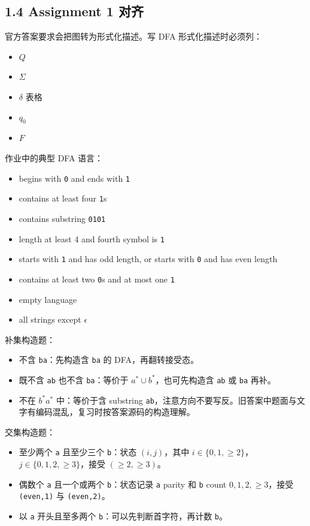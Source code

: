 ﻿\documentclass[UTF8,11pt]{ctexart}
\begin{document}
\subsection{1.4 Assignment 1 对齐}


官方答案要求会把图转为形式化描述。写 DFA 形式化描述时必须列：


\begin{itemize}
\item \(Q\)
\item \(\Sigma\)
\item \(\delta\) 表格
\item \(q_0\)
\item \(F\)
\end{itemize}


作业中的典型 DFA 语言：


\begin{itemize}
\item begins with \texttt{0} and ends with \texttt{1}
\item contains at least four \texttt{1}s
\item contains substring \texttt{0101}
\item length at least 4 and fourth symbol is \texttt{1}
\item starts with \texttt{1} and has odd length, or starts with \texttt{0} and has even length
\item contains at least two \texttt{0}s and at most one \texttt{1}
\item empty language
\item all strings except \(\epsilon\)
\end{itemize}


补集构造题：


\begin{itemize}
\item 不含 \texttt{ba}：先构造含 \texttt{ba} 的 DFA，再翻转接受态。
\item 既不含 \texttt{ab} 也不含 \texttt{ba}：等价于 \(a^*\cup b^*\)，也可先构造含 \texttt{ab} 或 \texttt{ba} 再补。
\item 不在 \(b^*a^*\) 中：等价于含 substring \texttt{ab}，注意方向不要写反。旧答案中题面与文字有编码混乱，复习时按答案源码的构造理解。
\end{itemize}


交集构造题：


\begin{itemize}
\item 至少两个 \texttt{a} 且至少三个 \texttt{b}：状态 \((i,j)\)，其中 \(i\in\{0,1,\ge2\}\)，\(j\in\{0,1,2,\ge3\}\)，接受 \((\ge2,\ge3)\)。
\item 偶数个 \texttt{a} 且一个或两个 \texttt{b}：状态记录 \texttt{a} parity 和 \texttt{b} count \(0,1,2,\ge3\)，接受 \texttt{(even,1)} 与 \texttt{(even,2)}。
\item 以 \texttt{a} 开头且至多两个 \texttt{b}：可以先判断首字符，再计数 \texttt{b}。
\end{itemize}
\end{document}

